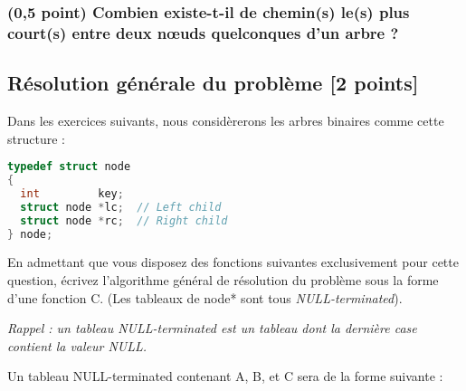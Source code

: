 \documentclass[11pt,a4paper]{article}
\begin{document}
\subsubsection{(0,5 point) Combien existe-t-il de chemin(s) le(s) plus court(s) entre deux nœuds quelconques d'un arbre ?}



%


\clearpage


\subsection{Résolution générale du problème [2 points]}

\noindent Dans les exercices suivants, nous considèrerons les arbres binaires comme cette structure  :

\begin{center}
\begin{lstlisting}[language=C,commentstyle=\color{teal}\ttfamily,morekeywords={node}]
typedef struct node
{
  int         key;
  struct node *lc;  // Left child
  struct node *rc;  // Right child
} node;
\end{lstlisting}
\end{center}

\noindent En admettant que vous disposez des fonctions suivantes exclusivement pour cette question, écrivez l'algorithme général de résolution du problème sous la forme d'une fonction C.
(Les tableaux de node* sont tous \textit{NULL-terminated}).

\medskip

\noindent \textit{Rappel : un tableau NULL-terminated est un tableau dont la dernière case contient la valeur NULL.}

\medskip

\setlength\fboxrule{0.2pt}
\noindent Un tableau NULL-terminated contenant A, B, et C sera de la forme suivante : 
\setlength\fboxrule{0.4pt}
\end{document}
